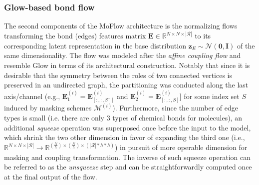 \subsubsection{Glow-based bond flow}

The second components of the MoFlow architecture is the normalizing flows
transforming the bond (edges) features matrix $\mathbf{E} \in \mathbb{R}^{N
\times N \times |\mathcal{R}|}$ to its corresponding latent representation in
the base distribution $\mathbf{z}_{E} \sim \mathcal{N}(\mathbf{0}, \mathbf{I})$
of the same dimensionality. The flow was modeled after the \textit{affine
coupling flow} and resemble Glow \citep{kingmaGlowGenerativeFlow2018} in terms of
its architectural construction. Notably that since it is desirable that the
symmetry between the roles of two connected vertices is preserved in an
undirected graph, the partitioning was conducted along the last axis/channel
(e.g., $\mathbf{E}^{(i)}_1 = \mathbf{E}^{(i)}_{[:,:,S^-]}$ and
$\mathbf{E}^{(i)}_2  = \mathbf{E}^{(i)}_{[:,:,S]}]$ for some index set $S$
induced by masking schemes $\mathcal{M}^{(i)}$). Furthermore, since the number
of edge types is small (i.e. there are only $3$ types of chemical bonds for
molecules), an additional \textit{squeeze} operation was superposed once before
the input to the model, which shrink the two other dimension in favor of
expanding the third one (i.e., $\mathbb{R}^{N \times N \times |\mathcal{R}|}
\longrightarrow \mathbb{R}^{ \left(\frac{N}{h}\right) \times
\left(\frac{N}{h}\right) \times (|\mathcal{R}| * h * h)}$) in pursuit of more
operable dimension for masking and coupling transformation. The inverse of such
squeeze operation can be referred to as the \textit{unsqueeze} step and can be
straightforwardly computed once at the final output of the flow.

